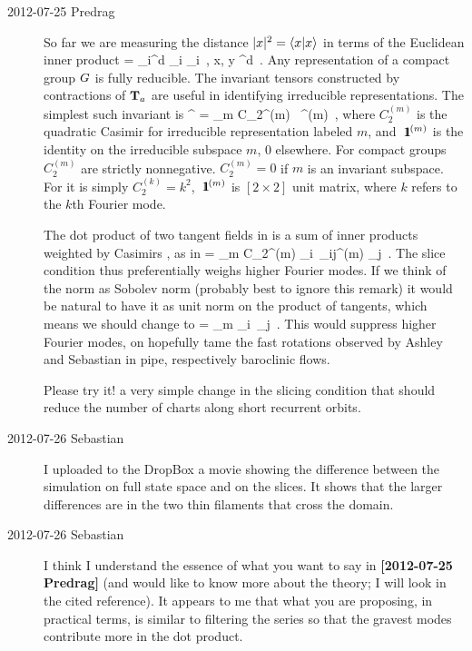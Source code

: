 \begin{description}
\item[2012-07-25 Predrag]
So far we are measuring the distance $|\ssp|^2=\braket{\ssp}{\ssp}$ in
terms of the Euclidean inner product
\beq
\braket{\ssp}{\slicep} = \sum_i^d {\ssp}_i \slicep_i
    \,,\; \qquad
x, y \in \pS \subset \reals^d
	\,.
Any representation of a compact group $G$ is fully
reducible. The invariant tensors constructed by contractions
of $\mathbf{T}_a$ are useful in identifying irreducible representations. The
simplest such invariant is
\beq
{\Lg}^{\dagger} \cdot \Lg = \sum_m C_2^{(m)} \, \id^{(m)}
\,,
where $C_2^{(m)}$ is the quadratic Casimir for irreducible representation
labeled $m$, and ${\ \hbox{{\rm 1}\kern-.6em\hbox{\rm 1}}}^{(m)}$ is the identity on the irreducible subspace
$m$, 0 elsewhere. For compact groups $C_2^{(m)}$ are strictly
nonnegative. $C_2^{(m)} =0$ if $m$ is an invariant subspace. For 
it is simply $C_2^{(k)} =k^2$, ${\ \hbox{{\rm 1}\kern-.6em\hbox{\rm 1}}}^{(m)}$ is $[2\!\times\! 2]$ unit matrix,
where $k$ refers to the $k$th Fourier
mode.

The dot product of two tangent fields in  is a sum of inner
products weighted by Casimirs , as in 
\beq
\braket{\groupTan(\ssp)}{\groupTan(\slicep)}
   = \sum_m C_2^{(m)} {\ssp}_i\, \delta_{ij}^{(m)} \slicep_j
\,.
The slice condition thus preferentially weighs higher Fourier modes. If
we think of the norm as Sobolev norm (probably best to ignore this
remark) it would be natural to have it as unit norm on the product of
tangents, which  means we should change  to
\beq
\braket{\ssp}{\slicep}
   = \sum_m {\ssp}_i\,  \slicep_j
\,.
This would suppress higher Fourier modes, on hopefully tame the fast
rotations observed by Ashley and Sebastian in pipe, respectively
baroclinic  flows.

{\color{red} Please try it!} a very simple change in the slicing condition that
should reduce the number of charts along short recurrent orbits.

\item[2012-07-26 Sebastian] I uploaded to the DropBox a movie showing the difference between the simulation on full state space and on the slices. It shows that the larger differences are in the two thin filaments that cross the domain.

\item[2012-07-26 Sebastian] I think I understand the essence of what you want to say in \textbf{[2012-07-25 Predrag]} (and would like to know more about the theory; I will look in the cited reference). It appears to me that what you are proposing, in practical terms, is similar to filtering the series so that the gravest modes contribute more in the dot product.


\end{description}
